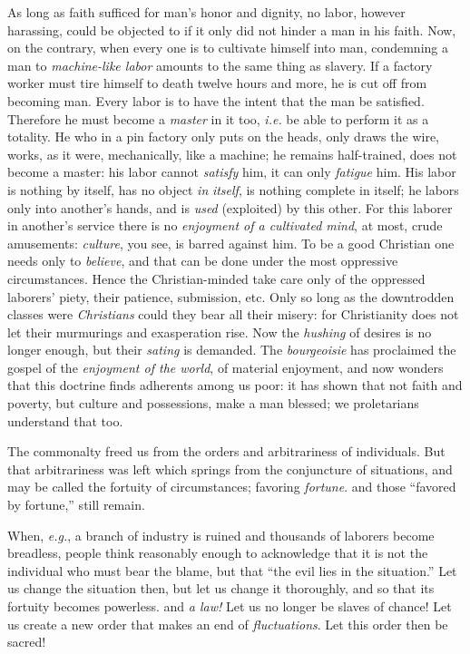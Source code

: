 \documentclass[12pt,a4paper]{book}
\begin{document}
As long as faith sufficed for man's honor and dignity, no labor, however 
harassing, could be objected to if it only did not hinder a man in his faith. 
Now, on the contrary, when every one is to cultivate himself into man, 
condemning a man to \textit{machine-like labor} amounts to the same thing as 
slavery. If a factory worker must tire himself to death twelve hours and more, 
he is cut off from becoming man. Every labor is to have the intent that the 
man be satisfied. Therefore he must become a \textit{master} in it too, 
\textit{i.e.} be able to perform it as a totality. He who in a pin factory 
only puts on the heads, only draws the wire, works, as it were, mechanically, 
like a machine; he remains half-trained, does not become a master: his labor 
cannot \textit{satisfy} him, it can only \textit{fatigue} him. His labor is 
nothing by itself, has no object \textit{in} \textit{itself}, is nothing 
complete in itself; he labors only into another's hands, and is \textit{used} 
(exploited) by this other. For this laborer in another's service there is no 
\textit{enjoyment of a cultivated mind}, at most, crude amusements: 
\textit{culture}, you see, is barred against him. To be a good Christian one 
needs only to \textit{believe}, and that can be done under the most oppressive 
circumstances. Hence the Christian-minded take care only of the oppressed 
laborers' piety, their patience, submission, etc. Only so long as the 
downtrodden classes were \textit{Christians} could they bear all their misery: 
for Christianity does not let their murmurings and exasperation rise. Now the 
\textit{hushing} of desires is no longer enough, but their \textit{sating} is 
demanded. The \textit{bourgeoisie} has proclaimed the gospel of the 
\textit{enjoyment of the world}, of material enjoyment, and now wonders that 
this doctrine finds adherents among us poor: it has shown that not faith and 
poverty, but culture and possessions, make a man blessed; we proletarians 
understand that too.

The commonalty freed us from the orders and arbitrariness of individuals. But 
that arbitrariness was left which springs from the conjuncture of situations, 
and may be called the fortuity of circumstances; favoring \textit{fortune}. 
and those ``favored by fortune,'' still remain.

When, \textit{e.g.}, a branch of industry is ruined and thousands of laborers 
become breadless, people think reasonably enough to acknowledge that it is not 
the individual who must bear the blame, but that ``the evil lies in the 
situation.'' Let us change the situation then, but let us change it 
thoroughly, and so that its fortuity becomes powerless. and \textit{a law!} 
Let us no longer be slaves of chance! Let us create a new order that makes an 
end of \textit{fluctuations}. Let this order then be sacred!
\end{document}

